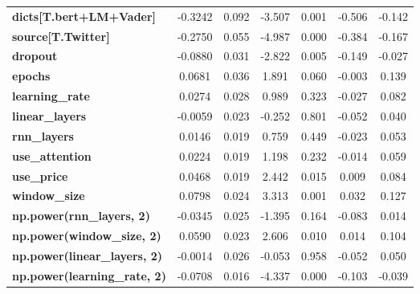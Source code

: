 \begin{center}
\begin{tabular}{lcccccc}
\textbf{dicts[T.bert+LM+Vader]}      &      -0.3242  &        0.092     &    -3.507  &         0.001        &       -0.506    &       -0.142     \\
\textbf{source[T.Twitter]}           &      -0.2750  &        0.055     &    -4.987  &         0.000        &       -0.384    &       -0.167     \\
\textbf{dropout}                     &      -0.0880  &        0.031     &    -2.822  &         0.005        &       -0.149    &       -0.027     \\
\textbf{epochs}                      &       0.0681  &        0.036     &     1.891  &         0.060        &       -0.003    &        0.139     \\
\textbf{learning\_rate}              &       0.0274  &        0.028     &     0.989  &         0.323        &       -0.027    &        0.082     \\
\textbf{linear\_layers}              &      -0.0059  &        0.023     &    -0.252  &         0.801        &       -0.052    &        0.040     \\
\textbf{rnn\_layers}                 &       0.0146  &        0.019     &     0.759  &         0.449        &       -0.023    &        0.053     \\
\textbf{use\_attention}              &       0.0224  &        0.019     &     1.198  &         0.232        &       -0.014    &        0.059     \\
\textbf{use\_price}                  &       0.0468  &        0.019     &     2.442  &         0.015        &        0.009    &        0.084     \\
\textbf{window\_size}                &       0.0798  &        0.024     &     3.313  &         0.001        &        0.032    &        0.127     \\
\textbf{np.power(rnn\_layers, 2)}    &      -0.0345  &        0.025     &    -1.395  &         0.164        &       -0.083    &        0.014     \\
\textbf{np.power(window\_size, 2)}   &       0.0590  &        0.023     &     2.606  &         0.010        &        0.014    &        0.104     \\
\textbf{np.power(linear\_layers, 2)} &      -0.0014  &        0.026     &    -0.053  &         0.958        &       -0.052    &        0.050     \\
\textbf{np.power(learning\_rate, 2)} &      -0.0708  &        0.016     &    -4.337  &         0.000        &       -0.103    &       -0.039     \\

\end{tabular}
\end{center}
